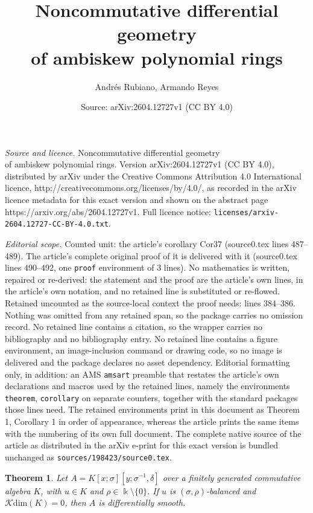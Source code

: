\documentclass[10pt,a4paper]{amsart}
\title{Noncommutative differential geometry \\ of ambiskew polynomial rings}
\author{Andr\'es Rubiano, Armando Reyes}
\date{Source: arXiv:2604.12727v1 (CC BY 4.0)}
\newtheorem{theorem}{Theorem}
\begin{document}
\maketitle

\noindent\emph{Source and licence.} Noncommutative differential geometry \\ of ambiskew polynomial rings. Version arXiv:2604.12727v1 (CC BY 4.0), distributed by arXiv under the Creative Commons Attribution 4.0 International licence, http://creativecommons.org/licenses/by/4.0/, as recorded in the arXiv licence metadata for this exact version and shown on the abstract page https://arxiv.org/abs/2604.12727v1. Full licence notice: \texttt{licenses/arxiv-2604.12727-CC-BY-4.0.txt}.\par\smallskip

\noindent\textit{Editorial scope.} Counted unit: the article's corollary Cor37 (source0.tex lines 487--489). The article's complete original proof of it is delivered with it (source0.tex lines 490--492, one \texttt{proof} environment of 3 lines). No mathematics is written, repaired or re-derived: the statement and the proof are the article's own lines, in the article's own notation, and no retained line is substituted or re-flowed.  Retained uncounted as the source-local context the proof needs: lines 384--386.  Nothing was omitted from any retained span, so the package carries no omission record.  No retained line contains a citation, so the wrapper carries no bibliography and no bibliography entry.  No retained line contains a figure environment, an image-inclusion command or drawing code, so no image is delivered and the package declares no asset dependency.  Editorial formatting only, in addition: an AMS \texttt{amsart} preamble that restates the article's own declarations and macros used by the retained lines, namely the environments \texttt{theorem}, \texttt{corollary} on separate counters, together with the standard packages those lines need.  The retained environments print in this document as Theorem 1, Corollary 1 in order of appearance, whereas the article prints the same items with the numbering of its own full document.  The complete native source of the article as distributed in the arXiv e-print for this exact version is bundled unchanged as \texttt{sources/198423/source0.tex}.
\begin{theorem}\label{NoSigma}
Let $A = K[x; \sigma][y; \sigma^{-1}, \delta]$ over a finitely generated commutative algebra $K$, with $u\in K$ and $\rho\in\Bbbk\setminus\{0\}$. If $u$ is $(\sigma,\rho)$-balanced and $\mathcal{K}\text{dim}(K)=0$, then $A$ is differentially smooth.
\end{theorem}
\end{document}
